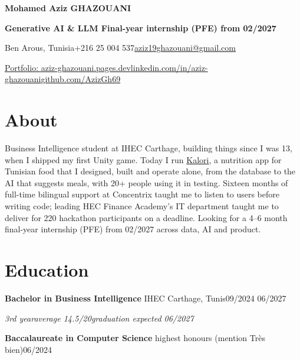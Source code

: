\documentclass[10pt]{article}
\newcommand{\entry}[3]{\par\vspace{2pt}\textbf{#1}#2\hfill{\color{soft}#3}\par}
\newcommand{\sub}[1]{{\itshape\color{soft}#1\par}}
\newcommand{\sep}{\enspace\textperiodcentered\enspace}
\begin{document}
{\fontsize{21}{24}\selectfont\bfseries Mohamed Aziz GHAZOUANI\par}
\vspace{2pt}
{\color{accent}\bfseries\fontsize{11}{13}\selectfont Generative AI \& LLM \textbar{} Final-year internship (PFE) from 02/2027\par}
\vspace{2pt}
{\small Ben Arous, Tunisia\sep +216 25 004 537\sep \href{mailto:aziz19ghazouani@gmail.com}{aziz19ghazouani@gmail.com}\par
\href{https://aziz-ghazouani.pages.dev}{Portfolio: aziz-ghazouani.pages.dev}\sep \href{https://www.linkedin.com/in/aziz-ghazouani/}{linkedin.com/in/aziz-ghazouani}\sep \href{https://github.com/AzizGh69}{github.com/AzizGh69}\par}
\section{About}
Business Intelligence student at IHEC Carthage, building things since I was 13, when I shipped my first Unity game. Today I run \href{https://kalori-app.com}{Kalori}, a nutrition app for Tunisian food that I designed, built and operate alone, from the database to the AI that suggests meals, with 20+ people using it in testing. Sixteen months of full-time bilingual support at Concentrix taught me to listen to users before writing code; leading HEC Finance Academy's IT department taught me to deliver for 220 hackathon participants on a deadline. Looking for a 4--6 month final-year internship (PFE) from 02/2027 across data, AI and product.
\section{Education}
\entry{Bachelor in Business Intelligence}{ \textendash{} IHEC Carthage, Tunis}{09/2024 \textendash{} 06/2027}
\sub{3rd year\sep average 14.5/20\sep graduation expected 06/2027}
\entry{Baccalaureate in Computer Science}{ \textendash{} highest honours (mention Très bien)}{06/2024}
\end{document}
